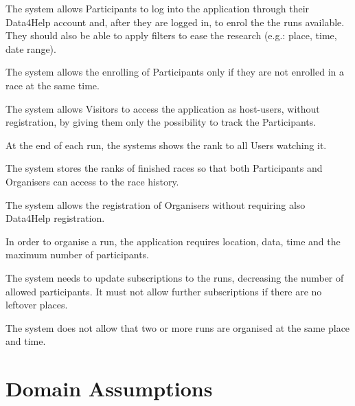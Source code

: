 \begin{enumerate}[label={[}R3.\arabic*{]}, leftmargin=*]

    \item \label{R3-login-enrollin} The system allows Participants to log into the application through their Data4Help account and, after they are logged in, to enrol the the runs available. They should also be able to apply filters to ease the research (e.g.: place, time, date range).
    
    \item \label{R3-enrolling-different-time} The system allows the enrolling of Participants only if they are not enrolled in a race at the same time.
    
    \item \label{R3-visitors} The system allows Visitors to access the application as host-users, without registration, by giving them only the possibility to track the Participants.
    
    \item \label{R3-ranking-end} At the end of each run, the systems shows the rank to all Users watching it.
    
    \item \label{R3-ranking-storage} The system stores the ranks of finished races so that both Participants and Organisers can access to the race history.
    
    \item \label{R3-organizer-registration} The system allows the registration of Organisers without requiring also Data4Help registration.
    
    \item \label{R3-run-organization} In order to organise a run, the application requires location, data, time and the maximum number of participants.
    
    \item \label{R3-decreasing-participant-number} The system needs to update subscriptions to the runs, decreasing the number of allowed participants. It must not allow further subscriptions if there are no leftover places.
    
    \item \label{R3-run-different-time} The system does not allow that two or more runs are organised at the same place and time.

\end{enumerate}


\section{Domain Assumptions}

